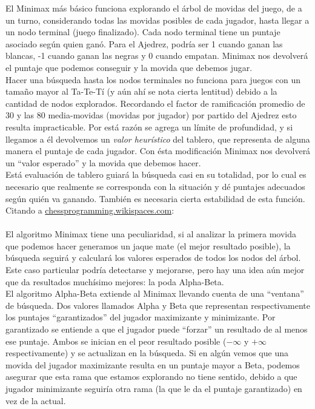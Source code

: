 \documentclass{article}
\begin{document}
El Minimax más básico funciona explorando el árbol de movidas del
juego, de a un turno, considerando todas las movidas posibles de cada
jugador, hasta llegar a un nodo terminal (juego finalizado). Cada nodo
terminal tiene un puntaje asociado según quien ganó. Para el Ajedrez,
podría ser 1 cuando ganan las blancas, -1 cuando ganan las negras y 0
cuando empatan. Minimax nos devolverá el puntaje que podemos conseguir
y la movida que debemos jugar.
\\

Hacer una búsqueda hasta los nodos terminales no funciona para juegos
con un tamaño mayor al Ta-Te-Tí (y aún ahí se nota cierta lentitud)
debido a la cantidad de nodos explorados. Recordando el factor de
ramificación promedio de 30 y las 80 media-movidas (movidas por
jugador) por partido del Ajedrez esto resulta impracticable. Por
está razón se agrega un límite de profundidad, y si llegamos a él
devolvemos un \emph{valor heurístico} del tablero, que representa
de alguna manera el puntaje de cada jugador. Con ésta modificación
Minimax nos devolverá un ``valor esperado'' y la movida que debemos
hacer.
\\

Está evaluación de tablero guiará la búsqueda casi en su
totalidad, por lo cual es necesario que realmente se corresponda con
la situación y dé puntajes adecuados según quién va ganando.
También es necesaria cierta estabilidad de esta función. Citando a
\href{http://chessprogramming.wikispaces.com/}{chessprogramming.wikispaces.com}:
\\

\noindent
{}
\\

El algoritmo Minimax tiene una peculiaridad, si al analizar la primera
movida que podemos hacer generamos un jaque mate (el mejor resultado
posible), la búsqueda seguirá y calculará los valores esperados de
todos los nodos del árbol. Este caso particular podría detectarse y
mejorarse, pero hay una idea aún mejor que da resultados muchísimo
mejores: la poda Alpha-Beta.
\\

El algoritmo Alpha-Beta extiende al Minimax llevando cuenta de una
``ventana'' de búsqueda. Dos valores llamados Alpha y Beta que
representan respectivamente los puntajes ``garantizados'' del jugador
maximizante y minimizante. Por garantizado se entiende a que el jugador
puede ``forzar'' un resultado de al menos ese puntaje. Ambos se inician
en el peor resultado posible ($-\infty$ y $+\infty$ respectivamente)
y se actualizan en la búsqueda. Si en algún vemos que una movida
del jugador maximizante resulta en un puntaje mayor a Beta, podemos
asegurar que esta rama que estamos explorando no tiene sentido, debido
a que jugador minimizante seguiría otra rama (la que le da el puntaje
garantizado) en vez de la actual.
\\
\end{document}
